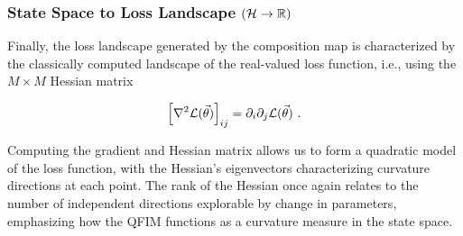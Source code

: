 \subsubsection{State Space to Loss Landscape \((\mathcal{H} \to \mathbb{R})\)}

Finally, the loss landscape generated by the composition map is characterized by
the classically computed landscape of the real-valued loss function, i.e., using
the \(M\times M\) Hessian matrix

\begin{equation}
    \left[\nabla^2 \mathcal{L}(\vec{\theta}) \right]_{ij} = \partial_i\partial_j \mathcal{L}(\vec{\theta})~.
\end{equation}

Computing the gradient and Hessian matrix allows us to form a quadratic model of
the loss function, with the Hessian's eigenvectors characterizing curvature
directions at each point. The rank of the Hessian once again relates to the
number of independent directions explorable by change in parameters, emphasizing
how the QFIM functions as a curvature measure in the state space.
